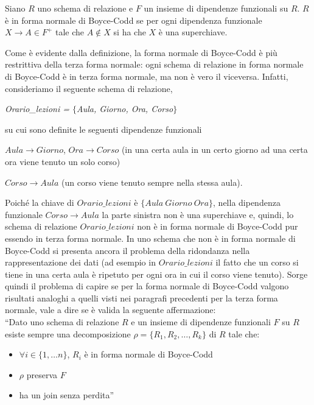 \begin{defn}
Siano $R$ uno schema di relazione e $F$ un insieme di dipendenze funzionali su $R$. $R$ è in forma normale di Boyce-Codd 
se per ogni dipendenza funzionale $X \rightarrow A \in F^+$ tale che $A \not\in X$ si ha che $X$ è una superchiave.
\end{defn}
Come è evidente dalla definizione, la forma normale di Boyce-Codd è più restrittiva della terza forma normale: ogni schema 
di relazione in forma normale di Boyce-Codd è in terza forma normale, ma non è vero il viceversa. Infatti, consideriamo 
il seguente schema di relazione, 
\begin{center}
\emph{Orario\_lezioni = $\{$Aula, Giorno, Ora, Corso$\}$}                      
\end{center}
su cui sono definite le seguenti dipendenze funzionali 
\begin{center}
$Aula \rightarrow Giorno$, $Ora \rightarrow Corso$ (in una certa aula in un certo giorno ad una certa
ora viene tenuto un solo corso)  
\end{center}
\begin{center}
$Corso \rightarrow Aula$ (un corso viene tenuto sempre nella stessa aula).
\end{center}
Poiché la chiave di $Orario\_lezioni$ è $\{Aula\ Giorno\ Ora\}$, nella dipendenza funzionale $Corso \rightarrow Aula$ la
parte sinistra non è una superchiave e, quindi, lo schema di relazione $Orario\_lezioni$ non è in forma normale di 
Boyce-Codd pur essendo in terza forma normale. In uno schema che non è in forma normale di Boyce-Codd si presenta ancora 
il problema della ridondanza nella rappresentazione dei dati (ad esempio in $Orario\_lezioni$ il fatto che un corso si 
tiene in una certa aula è ripetuto per ogni ora in cui il corso viene tenuto). Sorge quindi il problema di capire se per
la forma normale di Boyce-Codd valgono risultati analoghi a quelli visti nei paragrafi precedenti per la terza forma
normale, vale a dire se è valida la seguente affermazione:\\

``Dato uno schema di relazione $R$ e un insieme di dipendenze funzionali $F$ su $R$ esiste sempre una decomposizione 
$\rho=\{R_1, R_2, \ldots, R_k\}$ di $R$ tale che:
\begin{itemize}
 \item $\forall i \in \{1, \ldots n\}$, $R_i$ è in forma normale di Boyce-Codd
 \item $\rho$ preserva $F$
 \item ha un join senza perdita''
\end{itemize}

